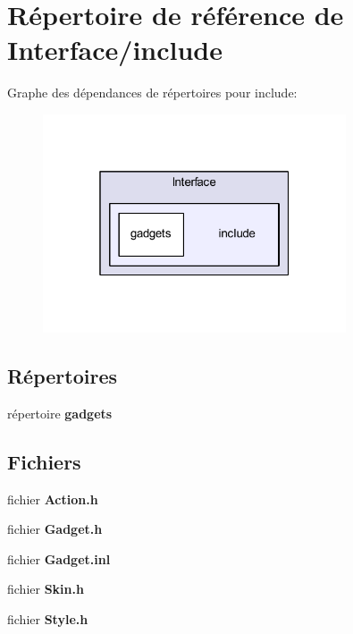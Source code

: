\section{Répertoire de référence de Interface/include}
\label{dir_b26ada46c7d42db83f11c4750604aea0}
Graphe des dépendances de répertoires pour include\+:\nopagebreak
\begin{figure}[H]
\begin{center}
\leavevmode
\includegraphics[width=254pt]{dir_b26ada46c7d42db83f11c4750604aea0_dep}
\end{center}
\end{figure}
\subsection*{Répertoires}
\begin{DoxyCompactItemize}
\item 
répertoire {\bf gadgets}
\end{DoxyCompactItemize}
\subsection*{Fichiers}
\begin{DoxyCompactItemize}
\item 
fichier {\bf Action.\+h}
\item 
fichier {\bf Gadget.\+h}
\item 
fichier {\bf Gadget.\+inl}
\item 
fichier {\bf Skin.\+h}
\item 
fichier {\bf Style.\+h}
\end{DoxyCompactItemize}
